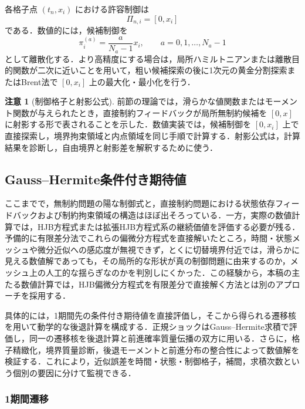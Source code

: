 \documentclass[10pt,a4paper]{article}
\theoremstyle{plain}
\theoremstyle{definition}
\newtheorem{remark}{注意}
\begin{document}
各格子点 $(t_n,x_i)$ における許容制御は
\begin{equation}
  \Pi_{n,i}=[0,x_i]
  \label{eq:control-interval}
\end{equation}
である．数値的には，候補制御を
\begin{equation}
  \pi_i^{(a)}=\frac{a}{N_a-1}x_i,
  \qquad a=0,1,\ldots,N_a-1
  \label{eq:control-grid}
\end{equation}
として離散化する．より高精度にする場合は，局所ハミルトニアンまたは離散目的関数が二次に近いことを用いて，粗い候補探索の後に1次元の黄金分割探索またはBrent法で $[0,x_i]$ 上の最大化・最小化を行う．

\begin{remark}[制御格子と射影公式]
前節の理論では，滑らかな値関数またはモーメント関数が与えられたとき，直接制約フィードバックが局所無制約候補を $[0,x]$ に射影する形で表されることを示した．数値実装では，候補制御を $[0,x_i]$ 上で直接探索し，境界拘束領域と内点領域を同じ手順で計算する．射影公式は，計算結果を診断し，自由境界と射影差を解釈するために使う．
\end{remark}

\subsection{Gauss--Hermite条件付き期待値}
\label{sec:gh}

ここまでで，無制約問題の陽な制御式と，直接制約問題における状態依存フィードバックおよび制約拘束領域の構造はほぼ出そろっている．一方，実際の数値計算では，HJB方程式または拡張HJB方程式系の継続価値を評価する必要が残る．予備的に有限差分法でこれらの偏微分方程式を直接解いたところ，時間・状態メッシュや微分近似への感応度が無視できず，とくに切替境界付近では，滑らかに見える数値解であっても，その局所的な形状が真の制御問題に由来するのか，メッシュ上の人工的な揺らぎなのかを判別しにくかった．この経験から，本稿の主たる数値計算では，HJB偏微分方程式を有限差分で直接解く方法とは別のアプローチを採用する．

具体的には，1期間先の条件付き期待値を直接評価し，そこから得られる遷移核を用いて動学的な後退計算を構成する．正規ショックはGauss--Hermite求積で評価し，同一の遷移核を後退計算と前進確率質量伝播の双方に用いる．さらに，格子精緻化，境界質量診断，後退モーメントと前進分布の整合性によって数値解を検証する．これにより，近似誤差を時間・状態・制御格子，補間，求積次数という個別の要因に分けて監視できる．

\subsubsection{1期間遷移}
\end{document}
